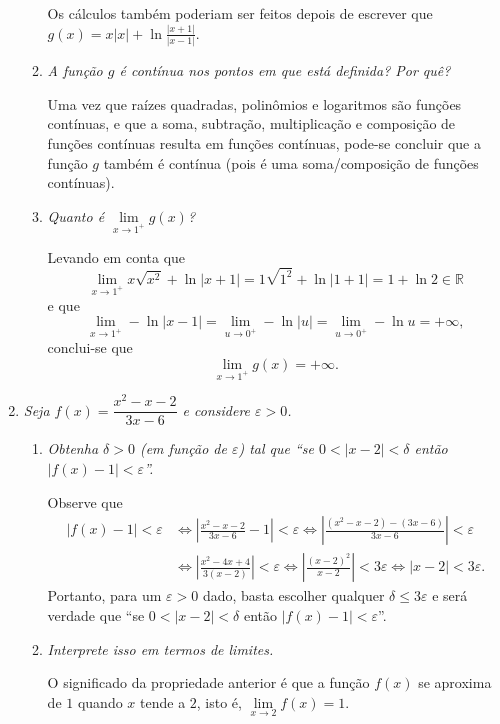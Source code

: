 \documentclass[12pt,a4paper]{article}
\newcommand*\abs[1]{\left|#1\right|}
\begin{document}
\begin{enumerate}
\begin{enumerate}
Os cálculos também poderiam ser feitos depois de escrever que $g(x) = x\abs{x} + \ln{\frac{ \abs{x + 1} }{ \abs{x - 1} } }$.

\item \textit{A função $g$ é contínua nos pontos em que está definida? Por quê?}

Uma vez que raízes quadradas, polinômios e logaritmos são funções contínuas, e que a soma, subtração, multiplicação e composição de funções contínuas resulta em funções contínuas, pode-se concluir que a função $g$ também é contínua (pois é uma soma/composição de funções contínuas).


\item \textit{Quanto é $\lim\limits_{x\to1^+} g(x)$?}

Levando em conta que
\[
\lim\limits_{x\to1^+} x\sqrt{x^2} + \ln{\abs{x + 1}}
= 1 \sqrt{1^2} + \ln{\abs{1 + 1}}
= 1 + \ln{2} \in \mathbb{R}
\]
e que
\[
\lim\limits_{x\to1^+} - \ln{\abs{x - 1}}
= \lim\limits_{u\to 0^+} - \ln{\abs{u}}
= \lim\limits_{u\to 0^+} - \ln{u}
= +\infty,
\]
conclui-se que
\[
\lim\limits_{x\to1^+} g(x) = + \infty.
\]

\end{enumerate}

\item \textit{Seja $f(x) = \dfrac{x^2 - x - 2}{3x - 6}$ e considere $\varepsilon > 0$.}
\begin{enumerate}
\item \textit{Obtenha $\delta > 0$ (em função de $\varepsilon$) tal que ``se $0 < \abs{x - 2} < \delta$ então $\abs{f(x) - 1} < \varepsilon$''.}

Observe que
\begin{align*}
\abs{f(x) - 1} < \varepsilon
& \Leftrightarrow \abs{ \frac{x^2 - x - 2}{3x - 6} - 1} < \varepsilon
  \Leftrightarrow \abs{\frac{(x^2 - x - 2) - (3x - 6)}{3x - 6}} < \varepsilon \\
& \Leftrightarrow \abs{\frac{x^2 - 4x + 4}{3(x - 2)}} < \varepsilon
  \Leftrightarrow \abs{\frac{(x - 2)^2}{x - 2}} < 3\varepsilon
  \Leftrightarrow \abs{x - 2} < 3 \varepsilon.
\end{align*}
Portanto, para um $\varepsilon>0$ dado, basta escolher qualquer $\delta \leq 3\varepsilon$ e será verdade que ``se $0 < \abs{x - 2} < \delta$ então $\abs{f(x) - 1} < \varepsilon$''.

\item \textit{Interprete isso em termos de limites.}

O significado da propriedade anterior é que a função $f(x)$ se aproxima de $1$ quando $x$ tende a $2$, isto é, $\lim\limits_{x\to2} f(x) = 1$.


\end{enumerate}
\end{enumerate}
\end{document}
